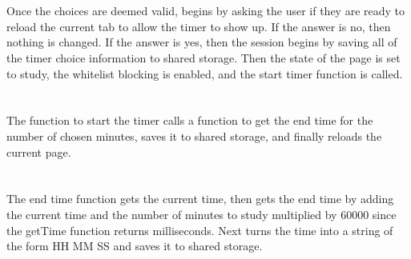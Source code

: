 \documentclass[12pt]{article}
\begin{document}
\\\\Once the choices are deemed valid, begins by asking the user if they are ready to reload the current tab to allow the timer to show up. 
If the answer is no, then nothing is changed. If the answer is yes, then the session begins by saving all of the timer choice information to shared storage.
Then the state of the page is set to study, the whitelist blocking is enabled, and the start timer function is called.\\

\\\\The function to start the timer calls a function to get the end time for the number of chosen minutes, saves it to shared storage, and finally reloads the current page.\\

\\\\The end time function gets the current time, then gets the end time by adding the current time and the number of minutes to study multiplied by 60000 since the getTime function
returns milliseconds. Next turns the time into a string of the form HH MM SS and saves it to shared storage.\\
\end{document}
